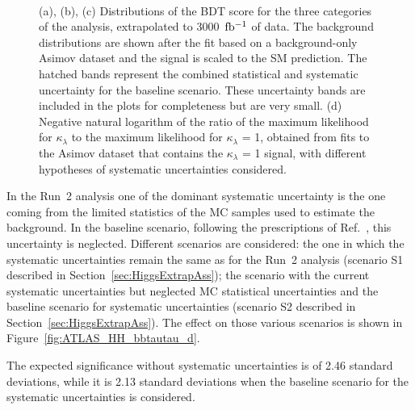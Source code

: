 \begin{figure}[!htb]
\centering 
{} 
\\
\caption{(a), (b), (c) Distributions of the BDT score for the three categories of the analysis, extrapolated to 3000~$\mbox{fb$^{-1}$}$ of data. The background distributions are shown after the fit based on a background-only Asimov dataset and the signal is scaled to the SM prediction. The hatched bands represent the combined statistical and systematic uncertainty for the baseline scenario. These uncertainty bands are included in the plots for completeness but are very small. (d) Negative natural logarithm of the ratio of the maximum likelihood for $\kappa_{\lambda}$ to the maximum likelihood for $\kappa_{\lambda}$ = 1, obtained from fits to the Asimov dataset that contains the $\kappa_{\lambda}$ = 1 signal, with different hypotheses of systematic uncertainties considered.} 
\label{fig:ATLAS_HH_bbtautau} 
\end{figure}

In the Run~2 analysis one of the dominant systematic uncertainty is the one coming from the limited statistics of the MC samples used to estimate the background. In the baseline scenario, following the prescriptions of Ref.~\cite{ATLASperfPUBnote}, this uncertainty is neglected.
Different scenarios are considered: the one in which the systematic uncertainties remain the same as for the Run~2 analysis (scenario S1 described in Section~\ref{sec:HiggsExtrapAss}); the scenario with the current systematic uncertainties but neglected MC statistical uncertainties and the baseline scenario for systematic uncertainties (scenario S2 described in Section~\ref{sec:HiggsExtrapAss}). The effect on those various scenarios is shown in Figure~\ref{fig:ATLAS_HH_bbtautau_d}.

The expected significance without systematic uncertainties is of 2.46 standard deviations, while it is 2.13 standard deviations when the baseline scenario for the systematic uncertainties is considered.

